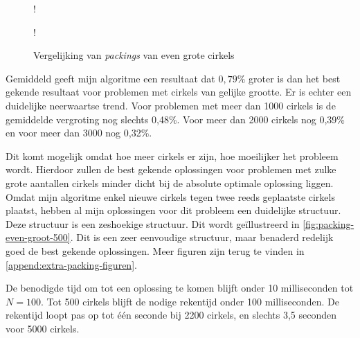 \documentclass[12pt,a4paper,oneside]{book}
\begin{document}
\begin {figure}
	\centering
	 {!} {
	}
	 {!} {
	}
	\caption{Vergelijking van \textit{packings} van even grote cirkels}
	\label{fig:vergelijking-even-grote-cirkels}
\end {figure}

Gemiddeld geeft mijn algoritme een resultaat dat $0,79\%$ groter is dan het best gekende resultaat voor problemen met cirkels van gelijke grootte.
Er is echter een duidelijke neerwaartse trend.
Voor problemen met meer dan 1000 cirkels is de gemiddelde vergroting nog slechts 0,48\%.
Voor meer dan 2000 cirkels nog 0,39\% en voor meer dan 3000 nog 0,32\%.

Dit komt mogelijk omdat hoe meer cirkels er zijn, hoe moeilijker het probleem wordt.
Hierdoor zullen de best gekende oplossingen voor problemen met zulke grote aantallen cirkels minder dicht bij de absolute optimale oplossing liggen.
Omdat mijn algoritme enkel nieuwe cirkels tegen twee reeds geplaatste cirkels plaatst, hebben al mijn oplossingen voor dit probleem een duidelijke structuur.
Deze structuur is een zeshoekige structuur.
Dit wordt geïllustreerd in \autoref{fig:packing-even-groot-500}.
Dit is een zeer eenvoudige structuur, maar benaderd redelijk goed de best gekende oplossingen.
Meer figuren zijn terug te vinden in \autoref{append:extra-packing-figuren}.

De benodigde tijd om tot een oplossing te komen blijft onder 10 milliseconden tot $N=100$.
Tot 500 cirkels blijft de nodige rekentijd onder 100 milliseconden.
De rekentijd loopt pas op tot één seconde bij 2200 cirkels, en slechts 3,5 seconden voor 5000 cirkels.
\end{document}
